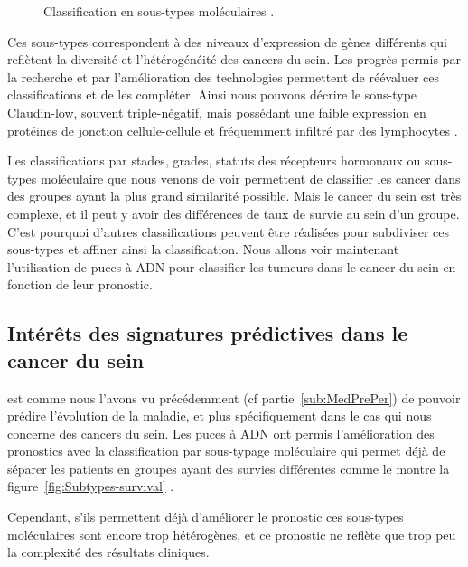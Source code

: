 			\begin{figure}
				\centering
				\def\svgwidth{\columnwidth}
				
				\caption{Classification en sous-types moléculaires \citep{Perou2000,Sorlie2001}.}
				\label{fig:Subtypes}
			\end{figure}

			Ces sous-types correspondent à des niveaux d'expression de gènes différents qui reflètent la diversité et l'hétérogénéité des cancers du sein.
			Les progrès permis par la recherche et par l'amélioration des technologies permettent de réévaluer ces classifications et de les compléter.
			Ainsi nous pouvons décrire le sous-type Claudin-low, souvent triple-négatif, mais possédant une faible expression en protéines de jonction cellule-cellule et fréquemment infiltré par des lymphocytes \citep{Miles2010,Harrell2013}.

			Les classifications par stades, grades, statuts des récepteurs hormonaux ou sous-types moléculaire que nous venons de voir permettent de classifier les cancer dans des groupes ayant la plus grand similarité possible.
			Mais le cancer du sein est très complexe, et il peut y avoir des différences de taux de survie au sein d'un groupe.
			C'est pourquoi d'autres classifications peuvent être réalisées pour subdiviser ces sous-types et affiner ainsi la classification.
			Nous allons voir maintenant l'utilisation de puces à \acs{ADN} pour classifier les tumeurs dans le cancer du sein en fonction de leur pronostic.

		\subsection{\textcolor{myred}{Intérêts des signatures prédictives dans le cancer du sein}}

			 est comme nous l'avons vu précédemment (cf partie~\ref{sub:MedPrePer}) de pouvoir prédire l'évolution de la maladie, et plus spécifiquement dans le cas qui nous concerne des cancers du sein. Les puces à \acs{ADN} ont permis l'amélioration des pronostics avec la classification par sous-typage moléculaire qui permet déjà de séparer les patients en groupes ayant des survies différentes comme le montre la figure~\ref{fig:Subtypes-survival} \citep{Perou2000,Sorlie2001,Hu2006}.

			Cependant, s'ils permettent déjà d'améliorer le pronostic ces sous-types moléculaires sont encore trop hétérogènes, et ce pronostic ne reflète que trop peu la complexité des résultats cliniques.

